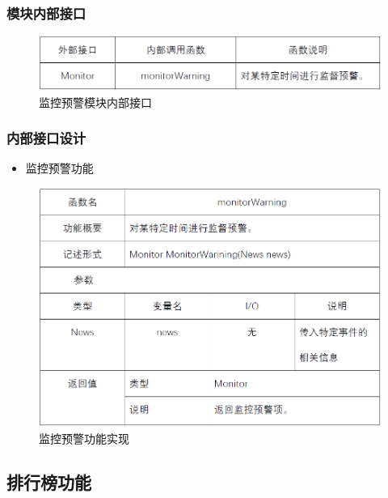 \subsubsection{模块内部接口}
\begin{figure}[!htbp]
	\centering
	\includegraphics[scale=0.75]{image/b15.png} %
	\caption{监控预警模块内部接口} %
\end{figure}
\subsubsection{内部接口设计}
\begin{itemize}
	\item 监控预警功能
\end{itemize}
\begin{figure}[!htbp]
	\centering
	\includegraphics[scale=0.75]{image/b16.png} %
	\caption{监控预警功能实现} %
\end{figure}
\subsection{排行榜功能}
